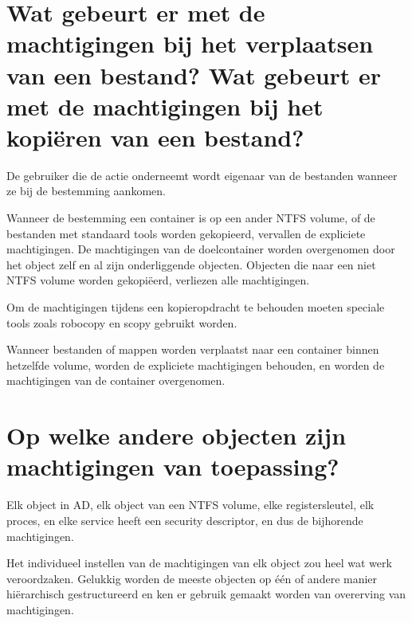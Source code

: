 \section{Wat gebeurt er met de machtigingen bij het verplaatsen van een bestand?
Wat gebeurt er met de machtigingen bij het kopiëren van een bestand?}

De gebruiker die de actie onderneemt wordt eigenaar van de bestanden wanneer ze
bij de bestemming aankomen.

Wanneer de bestemming een container is op een ander NTFS volume, of de bestanden
met standaard tools worden gekopieerd, vervallen de expliciete machtigingen. De
machtigingen van de doelcontainer worden overgenomen door het object zelf en al
zijn onderliggende objecten. Objecten die naar een niet NTFS volume worden
gekopiëerd, verliezen alle machtigingen.

Om de machtigingen tijdens een kopieropdracht te behouden moeten speciale tools
zoals robocopy en scopy gebruikt worden.

Wanneer bestanden of mappen worden verplaatst naar een container binnen
hetzelfde volume, worden de expliciete machtigingen behouden, en worden de
machtigingen van de container overgenomen.

\section{Op welke andere objecten zijn machtigingen van toepassing?}

Elk object in AD, elk object van een NTFS volume, elke registersleutel, elk
proces, en elke service heeft een security descriptor, en dus de bijhorende
machtigingen.

Het individueel instellen van de machtigingen van elk object zou heel wat werk
veroordzaken. Gelukkig worden de meeste objecten op één of andere manier
hiërarchisch gestructureerd en ken er gebruik gemaakt worden van overerving van
machtigingen.
